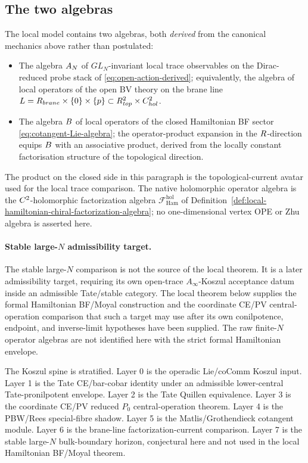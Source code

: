 \documentclass[11pt]{memoir}
\begin{document}
\subsection{The two algebras}\label{ssec:two-algebras}

The local model contains two algebras, both \emph{derived} from the
canonical mechanics above rather than postulated:
\begin{itemize}
  \item The algebra $A_N$ of $GL_N$-invariant local trace observables
    on the Dirac-reduced probe stack of \eqref{eq:open-action-derived};
    equivalently, the algebra of local operators of the open BV theory on
    the brane line
    \(L=R_{brane}\times\{0\}\times\{p\}
    \subset R^2_{top}\times C^2_{hol}\).
  \item The algebra $B$ of local operators of the closed Hamiltonian
    BF sector \eqref{eq:cotangent-Lie-algebra}; the operator-product
    expansion in the $R$-direction equips $B$ with an associative
    product, derived from the locally constant factorisation structure of
    the topological direction.
\end{itemize}
The product on the closed side in this paragraph is the topological-current
avatar used for the local trace comparison.  The native holomorphic
operator algebra is the \(C^2\)-holomorphic factorization algebra
\(\mathcal F^{\mathrm{hol}}_{\mathrm{Ham}}\) of
Definition~\ref{def:local-hamiltonian-chiral-factorization-algebra}; no
one-dimensional vertex OPE or Zhu algebra is asserted here.

\paragraph{Stable large-\(N\) admissibility target.}\label{conj:An-Koszul}
The stable large-\(N\) comparison is not the source of the local
theorem.  It is a later admissibility target, requiring its own
open-trace \(A_\infty\)-Koszul acceptance datum inside an admissible
Tate/stable category.  The local
theorem below supplies the formal Hamiltonian BF/Moyal construction and
the coordinate CE/PV central-operation comparison that such a target may
use after its own conilpotence, endpoint, and inverse-limit hypotheses
have been supplied.  The raw finite-\(N\) operator algebras are not
identified here with the strict formal Hamiltonian envelope.

The Koszul spine is stratified. Layer 0 is the operadic Lie/coComm
Koszul input. Layer 1 is the Tate CE/bar-cobar identity under an
admissible lower-central Tate-pronilpotent envelope. Layer 2 is the Tate Quillen
equivalence. Layer 3 is the coordinate CE/PV reduced \(P_0\)
central-operation theorem. Layer 4 is the PBW/Rees special-fibre shadow.
Layer 5 is the Matlis/Grothendieck cotangent module. Layer 6 is the
brane-line factorization-current comparison. Layer 7 is the stable
large-\(N\) bulk-boundary horizon, conjectural here and not used in the
local Hamiltonian BF/Moyal theorem.
\end{document}
